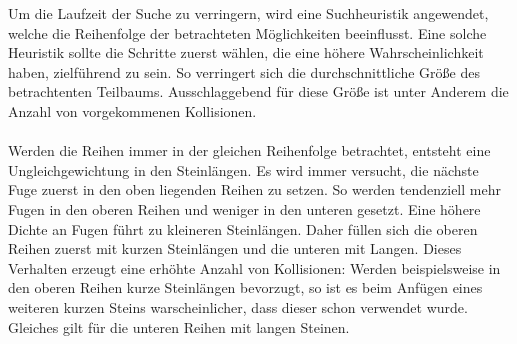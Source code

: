 \documentclass[a4paper, 12pt]{scrartcl}
\begin{document}
Um die Laufzeit der Suche zu verringern, wird eine Suchheuristik angewendet, welche die Reihenfolge der betrachteten Möglichkeiten beeinflusst. Eine solche Heuristik sollte die Schritte zuerst wählen, die eine höhere Wahrscheinlichkeit haben, zielführend zu sein. So verringert sich die durchschnittliche Größe des betrachtenten Teilbaums. Ausschlaggebend für diese Größe ist unter Anderem die Anzahl von vorgekommenen Kollisionen.
\\\\
Werden die Reihen immer in der gleichen Reihenfolge betrachtet, entsteht eine Ungleichgewichtung in den Steinlängen. Es wird immer versucht, die nächste Fuge zuerst in den oben liegenden Reihen zu setzen. So werden tendenziell mehr Fugen in den oberen Reihen und weniger in den unteren gesetzt. Eine höhere Dichte an Fugen führt zu kleineren Steinlängen. Daher füllen sich die oberen Reihen zuerst mit kurzen Steinlängen und die unteren mit Langen. Dieses Verhalten erzeugt eine erhöhte Anzahl von Kollisionen: Werden beispielsweise in den oberen Reihen kurze Steinlängen bevorzugt, so ist es beim Anfügen eines weiteren kurzen Steins warscheinlicher, dass dieser schon verwendet wurde. Gleiches gilt für die unteren Reihen mit langen Steinen.
\end{document}
